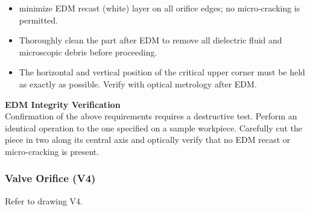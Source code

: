 \documentclass[12pt, letterpaper]{report}%
\newcounter{mycounter}           %
\newcounter{sub}[mycounter]      %
\begin{document}
\begin{appendices}
\begin{enumerate}[itemsep=4pt]
\begin{itemize}[itemsep=2pt]
									small a fillet radius as possible.
									This is the mission-critical corner; a larger fillet directly degrades
									the effective diameter accuracy.
						\item minimize EDM recast (white) layer on all orifice edges; no
									micro-cracking is permitted.
						\item Thoroughly clean the part after EDM to remove all dielectric fluid
									and microscopic debris before proceeding.
						\item The horizontal and vertical position of the critical
									upper corner must be held as exactly as possible.
									Verify with optical metrology after EDM.
					\end{itemize}
	\end{enumerate}

	\begin{notebox}
	\textbf{EDM Integrity Verification} \\
	Confirmation of the above requirements requires a destructive test.
	Perform an identical operation to the one specified on a sample workpiece. Carefully cut
	the piece in two along its central axis and optically verify that no EDM recast or
	micro-cracking is present.
	\end{notebox}

	\subsubsection{Valve Orifice (V4)}
	\label{sec:mfg:V4}

	Refer to drawing V4.


\end{appendices}
\end{document}
